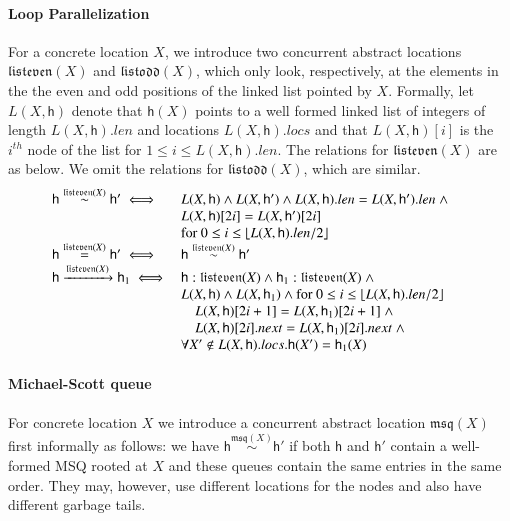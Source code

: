 \documentclass[nocopyrightspace,preprint]{sigplanconf}
\newcommand{\locListOdd}{\ensuremath{\mathfrak{listodd}}\xspace}
\newcommand{\locListEven}{\ensuremath{\mathfrak{listeven}}\xspace}
\newcommand{\locMSQ}{\ensuremath{\mathfrak{msq}}\xspace}
\newcommand{\cloc}{\ensuremath{X}\xspace}
\newcommand\heap{\ensuremath{\mathsf{h}}\xspace}
\newcommand\h{\heap}
\newcommand\inR[2]{\ensuremath{#1:#2}}
\newcommand\rloc[3]{\ensuremath{#1 \stackrel{#3}{\sim} #2}}
\newcommand\rrloc[3]{\ensuremath{#1 \stackrel{#3}{=} #2}}
\newcommand\gloc[3]{\ensuremath{#1 \xrightarrow{#3}#2}}
\begin{document}
\paragraph{Loop Parallelization} For a concrete location $\cloc$, we introduce two concurrent abstract locations $\locListEven(\cloc)$ and $\locListOdd(\cloc)$, which only look, respectively, at the elements in the the even and odd positions of the linked list pointed by $\cloc$. Formally, let $L(\cloc,\h)$ denote that $\h(\cloc)$ points to a well formed linked list of integers of length $L(\cloc,\h).len$ and locations $L(\cloc,\h).locs$ and that $L(\cloc,\h)[i]$ is the $i^{th}$ node of the list for $1 \leq i \leq L(\cloc,\h).len$. The relations for $\locListEven(\cloc)$ are as below. We omit the relations for $\locListOdd(\cloc)$, which are similar.
\[
\hspace{-4mm}
 \begin{array}{ll}
 \rloc{\h}{\h'}{\locListEven(\cloc)}
  \iff &   L(\cloc,\h) \land L(\cloc,\h') \land L(\cloc,\h).len = L(\cloc,\h').len ~\land\ \\ 
  & L(\cloc,\h)[2i] = L(\cloc,\h')[2i]\\ 
  &  \textrm{for } 0 \leq i \leq \lfloor L(\cloc,\h).len / 2 \rfloor
  \\
\rrloc{\h}{\h'}{\locListEven(\cloc)} \iff&  \rloc{\h}{\h'}{\locListEven(\cloc)}\\
    \gloc{\h}{\h_1}{\locListEven (\cloc)} \iff& 
  \inR{\h}{\locListEven (\cloc)} \land \inR{\h_1}{\locListEven (\cloc)}~ \land \\
  & L(\cloc,\h) \land L(\cloc,\h_1) \land \textrm{for } 0 \leq i \leq \lfloor L(\cloc,\h).len / 2 \rfloor\  \\
  & \quad L(\cloc,\h)[2i+1] = L(\cloc,\h_1)[2i+1]~ \land \\ 
  & \quad L(\cloc,\h)[2i].next = L(\cloc,\h_1)[2i].next~\land \\
  & \forall \cloc' \notin L(\cloc,\h).locs. \h(\cloc') = \h_1(\cloc)
 \end{array}
\]

\paragraph{Michael-Scott queue}
For concrete location $\cloc$ we introduce a concurrent abstract location $\locMSQ(\cloc)$ first informally as follows: we have $\rloc{\heap}{\heap'}{\locMSQ(\cloc)}$ if both $\heap$ and $\heap'$ contain a well-formed MSQ rooted at $\cloc$ and these queues contain the same entries in the same order. They may, however, use different locations for the nodes and also have different garbage tails. 
\end{document}

